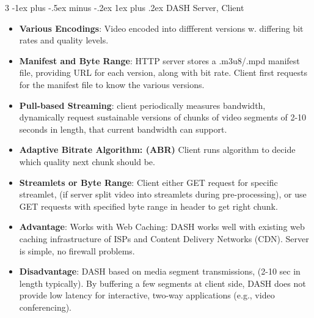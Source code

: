 \documentclass[8pt, a4paper, landscape]{article}
\makeatletter
\renewcommand{\subsubsection}{\@startsection{subsubsection}{3}{0.1mm}%
                                {-1ex plus -.5ex minus -.2ex}%
                                {1ex plus .2ex}%
                                {\normalfont\small\bfseries}}
\makeatother
\begin{document}
\begin{multicols*}{3}
\subsubsection{DASH Server, Client}
\begin{itemize}
\item \textbf{Various Encodings}: Video encoded into diffferent versions w. differing bit rates and quality levels.
\item \textbf{Manifest and Byte Range}: HTTP server stores a .m3u8/.mpd manifest file, providing URL for each version, along with bit rate. Client first requests for the manifest file to know the various versions.
\item \textbf{Pull-based Streaming}: client periodically measures bandwidth, dynamically request sustainable versions of chunks of video segments of 2-10 seconds in length, that current bandwidth can support.
\item \textbf{Adaptive Bitrate Algorithm: (ABR)} Client runs algorithm to decide which quality next chunk should be.
\item \textbf{Streamlets or Byte Range}: Client either GET request for specific streamlet, (if server split video into streamlets during pre-processing), or use GET requests with specified byte range in header to get right chunk.
\item \textbf{Advantage}: Works with Web Caching: DASH works well with existing web caching infrastructure of ISPs and Content Delivery Networks (CDN). Server is simple, no firewall problems.
\item \textbf{Disadvantage}:  DASH based on media segment transmissions, (2-10 sec in length typically). By buffering a few segments at client side, DASH does not provide low latency for interactive, two-way applications (e.g., video conferencing).
\end{itemize}



\end{multicols*}
\end{document}
